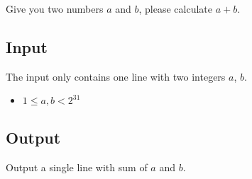
Give you two numbers $a$ and $b$, please calculate $a+b$.

\subsection*{Input}

The input only contains one line with two integers $a$, $b$.

\begin{itemize}
    \item $1 \leq a, b < 2^{31}$
\end{itemize}

\subsection*{Output}

Output a single line with sum of $a$ and $b$.
